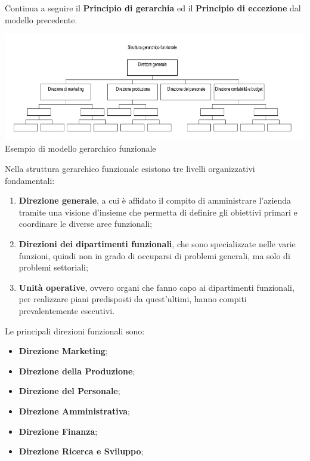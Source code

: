 \documentclass[14pt]{extarticle}
\begin{document}
Continua a seguire il \textbf{Principio di gerarchia} ed il \textbf{Principio di
eccezione} dal modello precedente.

\begin{center}
    \includegraphics[scale = 0.64]{images/modello_gerarchico_funzionale}
    Esempio di modello gerarchico funzionale
\end{center}
Nella struttura gerarchico funzionale esistono tre livelli organizzativi
fondamentali:

\begin{enumerate}
    \item \textbf{Direzione generale}, a cui è affidato il compito di
    amministrare l'azienda tramite una visione d'insieme che permetta di
    definire gli obiettivi primari e coordinare le diverse aree funzionali;
    \item \textbf{Direzioni dei dipartimenti funzionali}, che sono specializzate
    nelle varie funzioni, quindi non in grado di occuparsi di problemi generali,
    ma solo di problemi settoriali;
    \item \textbf{Unità operative}, ovvero organi che fanno capo ai dipartimenti
    funzionali, per realizzare piani predisposti da quest'ultimi, hanno compiti
    prevalentemente esecutivi. 
\end{enumerate}

Le principali direzioni funzionali sono:

\begin{itemize}
    \item \textbf{Direzione Marketing};
    \item \textbf{Direzione della Produzione};
    \item \textbf{Direzione del Personale};
    \item \textbf{Direzione Amministrativa};
    \item \textbf{Direzione Finanza};
    \item \textbf{Direzione Ricerca e Sviluppo};
\end{itemize}
\end{document}
